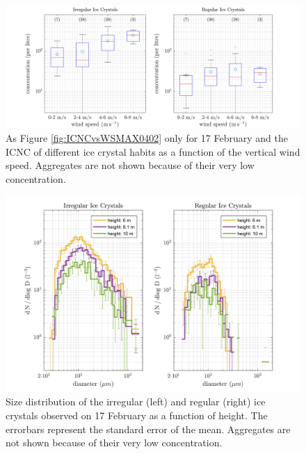 \documentclass[draft,linenumbers]{agujournal}
\begin{document}
\begin{figure}[t]
 \centering
 	\includegraphics[width=14cm]{1702_habitswWS.png}
 \caption{As Figure \ref{fig:ICNCvsWSMAX0402} only for 17 February and the ICNC of different ice crystal habits as a function of the vertical wind speed. Aggregates are not shown because of their very low concentration.}
 \label{fig:ICNCvsWindHabits1702}
\end{figure}

\begin{figure}[t]
 \centering
 	\includegraphics[width=14cm]{1702_habitswSpectrum.png}
 \caption{Size distribution of the irregular (left) and regular (right) ice crystals observed on 17 February as a function of height. The errorbars represent the standard error of the mean. Aggregates are not shown because of their very low concentration.}
 \label{fig:spectrum17}
\end{figure}
\end{document}
